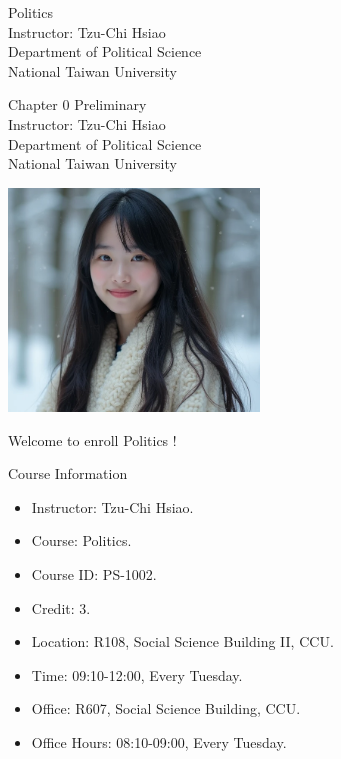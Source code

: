 \documentclass{beamer}
\title{}
\author{}
\date{}
\begin{document}
\begin{frame}
\begin{center}
\Large{Politics} \\
\vspace{3em}
\normalsize{Instructor: Tzu-Chi Hsiao} \\
\vspace{3em}
\small{Department of Political Science} \\
\vspace{1em}
\small{National Taiwan University}
\end{center}
\end{frame}
\begin{frame}
\begin{center}
\Large{Chapter 0 Preliminary} \\
\vspace{3em}
\normalsize{Instructor: Tzu-Chi Hsiao} \\
\vspace{3em}
\small{Department of Political Science} \\
\vspace{1em}
\small{National Taiwan University} \\
\end{center}
\end{frame}
\begin{frame}{}
\begin{center}
\includegraphics[width=0.5\textwidth]{instructor.png}
\end{center}
\vspace{1em}
\begin{center}
\Large{Welcome to enroll Politics !} \\
\end{center}
\end{frame}
\begin{frame}{Course Information}
\begin{itemize}
\pause
\item Instructor: Tzu-Chi Hsiao.
\pause
\item Course: Politics.
\pause
\item Course ID: PS-1002.
\pause
\item Credit: 3.
\pause
\item Location: R108, Social Science Building II, CCU.
\pause
\item Time: 09:10-12:00, Every Tuesday.
\pause
\item Office: R607, Social Science Building, CCU.
\pause
\item Office Hours: 08:10-09:00, Every Tuesday.
\end{itemize}
\end{frame}
\end{document}
